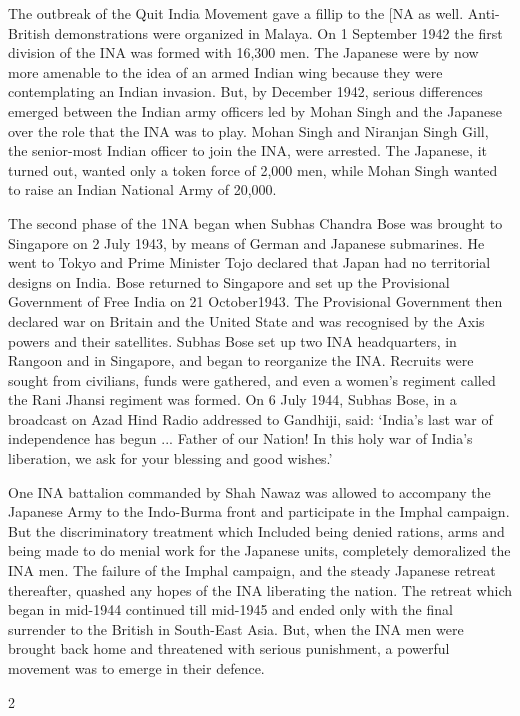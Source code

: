 \begin{multicols}{2}
The outbreak of the Quit India Movement gave a fillip to the [NA as well. Anti-British demonstrations were organized in Malaya. On 1 September 1942 the first division of the INA was formed with 16,300 men. The Japanese were by now more amenable to the idea of an armed Indian wing because they were contemplating an Indian invasion. But, by December 1942, serious differences emerged between the Indian army officers led by Mohan Singh and the Japanese over the role that the INA was to play. Mohan Singh and Niranjan Singh Gill, the senior-most Indian officer to join the INA, were arrested. The Japanese, it turned out, wanted only a token force of 2,000 men, while Mohan Singh wanted to raise an Indian National Army of 20,000.

The second phase of the 1NA began when Subhas Chandra Bose was brought to Singapore on 2 July 1943, by means of German and Japanese submarines. He went to Tokyo and Prime Minister Tojo declared that Japan had no territorial designs on India. Bose returned to Singapore and set up the Provisional Government of Free India on 21 October1943. The Provisional Government then declared war on Britain and the United State and was recognised by the Axis powers and their satellites. Subhas Bose set up two INA headquarters, in Rangoon and in Singapore, and began to reorganize the INA. Recruits were sought from civilians, funds were gathered, and even a women's regiment called the Rani Jhansi regiment was formed. On 6 July 1944, Subhas Bose, in a broadcast on Azad Hind Radio addressed to Gandhiji, said: `India's last war of independence has begun ... Father of our Nation! In this holy war of India's liberation, we ask for your blessing and good wishes.'

One INA battalion commanded by Shah Nawaz was allowed to accompany the Japanese Army to the Indo-Burma front and participate in the Imphal campaign. But the discriminatory treatment which Included being denied rations, arms and being made to do menial work for the Japanese units, completely demoralized the INA men. The failure of the Imphal campaign, and the steady Japanese retreat thereafter, quashed any hopes of the INA liberating the nation. The retreat which began in mid-1944 continued till mid-1945 and ended only with the final surrender to the British in South-East Asia. But, when the INA men were brought back home and threatened with serious punishment, a powerful movement was to emerge in their defence.
\end{multicols}{2}
